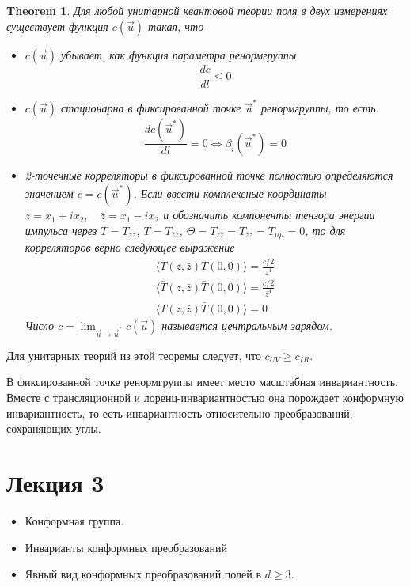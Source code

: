 \documentclass[a4paper,12pt]{article}
\newtheorem{theorem}{Theorem}
\theoremstyle{definition}
\theoremstyle{definition}
\theoremstyle{definition}
\begin{document}
\begin{theorem}
  Для любой унитарной квантовой теории поля в двух измерениях существует функция $c(\vec u)$ такая, что
  \label{c-theorem}
  \begin{itemize}
  \item $c(\vec u)$ убывает, как функция параметра ренормгруппы
    \begin{equation}
      \label{eq:95}
      \frac{dc}{dl}\leq 0
    \end{equation}
  \item $c(\vec u)$ стационарна в фиксированной точке $\vec u^*$ ренормгруппы, то есть
    \begin{equation}
      \label{eq:96}
      \frac{dc({\vec u^*})}{dl}=0 \Leftrightarrow \beta_i(\vec u^*)=0
    \end{equation}
  \item 2-точечные корреляторы в фиксированной точке полностью определяются значением $c=c(\vec u^*)$.
    Если ввести комплексные координаты $z=x_1+ix_2,\quad \bar z=x_1-ix_2$ и обозначить компоненты тензора энергии импульса через $T=T_{zz}$, $\bar T=T_{\bar z\bar z}$, $\Theta=T_{z\bar z}=T_{\bar z z}=T_{\mu\mu}=0$, то для корреляторов верно следующее выражение
    \begin{eqnarray}
      \label{eq:97}
      \langle T(z,\bar z)T(0,0)\rangle=\frac{c/2}{z^4}\\
      \langle \bar T(z,\bar z)\bar T(0,0)\rangle=\frac{c/2}{\bar z^4}\\
      \langle T(z,\bar z) \bar T(0,0)\rangle=0
    \end{eqnarray}
    Число $c=\lim_{\vec u\to \vec u^*} c(\vec u)$ называется центральным зарядом. 
  \end{itemize}
\end{theorem}
Для унитарных теорий из этой теоремы следует, что $c_{UV}\geq c_{IR}$.

В фиксированной точке ренормгруппы имеет место масштабная инвариантность. Вместе с трансляционной и
лоренц-инвариантностью она порождает конформную инвариантность, то есть инвариантность относительно
преобразований, сохраняющих углы. 

\section{Лекция 3}
\label{sec:-3}


  \begin{itemize}
  \item Конформная группа.
  \item Инварианты конформных преобразований
  \item Явный вид конформных преобразований полей в $d\geq 3$.
  \end{itemize}
\end{document}
